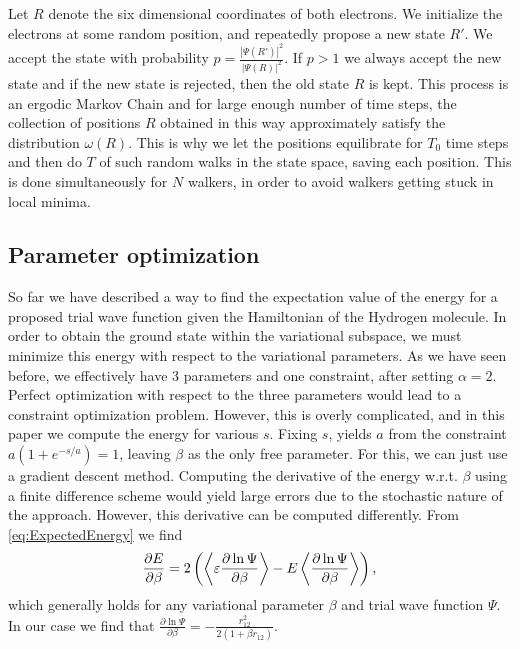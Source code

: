 \documentclass[twoside]{article}
\begin{document}
Let $R$ denote the six dimensional coordinates of both electrons. We initialize the electrons at some random position, and repeatedly propose a new state $R'$. We accept the state with probability $p = \frac{|\Psi(R')|^2}{|\Psi(R)|^2}$. If $p > 1$ we always accept the new state and if the new state is rejected, then the old state $R$ is kept. 
This process is an ergodic Markov Chain and for large enough number of time steps, the collection of positions $R$ obtained in this way approximately satisfy the distribution $\omega(R)$. This is why we let the positions equilibrate for $T_0$ time steps and then do $T$ of such random walks in the state space, saving each position. This is done simultaneously for $N$ walkers, in order to avoid walkers getting stuck in local minima.

\subsection{Parameter optimization}\label{sec:paramaterOptimization}
So far we have described a way to find the expectation value of the energy for a proposed trial wave function given the Hamiltonian of the Hydrogen molecule. In order to obtain the ground state within the variational subspace, we must minimize this energy with respect to the variational parameters. As we have seen before, we effectively have 3 parameters and one constraint, after setting $\alpha = 2$. Perfect optimization with respect to the three parameters would lead to a constraint optimization problem. However, this is overly complicated, and in this paper we compute the energy for various $s$. Fixing $s$, yields $a$ from the constraint $a(1+e^{-s/a}) = 1$, leaving $\beta$ as the only free parameter. For this, we can just use a gradient descent method. Computing the derivative of the energy w.r.t. $\beta$ using a finite difference scheme would yield large errors due to the stochastic nature of the approach. However, this derivative can be computed differently. From \eqref{eq:ExpectedEnergy} we find\cite{ref_Harju}\cite{ref_Thijssen} 
\begin{equation}
\frac{\partial E}{\partial \beta} = 2\left( \Braket{\varepsilon \frac{\partial \ln \Psi}{\partial \beta}} - E\Braket{\frac{\partial \ln \Psi}{\partial \beta}} \right),
\end{equation}
which generally holds for any variational parameter $\beta$ and trial wave function $\Psi$. In our case we find that $\frac{\partial \ln \Psi}{\partial \beta} = -\frac{r_{12}^2}{2(1+\beta r_{12})}$.
\end{document}
